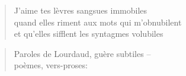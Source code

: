   \begin{verse}
    J’aime tes lèvres sangsues immobiles\\
    quand elles riment aux mots qui m’obnubilent\\
    et qu’elles sifflent les syntagmes volubiles
  \end{verse}
  \begin{verse}
    Paroles de Lourdaud, guère subtiles --\\
    poèmes, vers-proses: 
  \end{verse}
